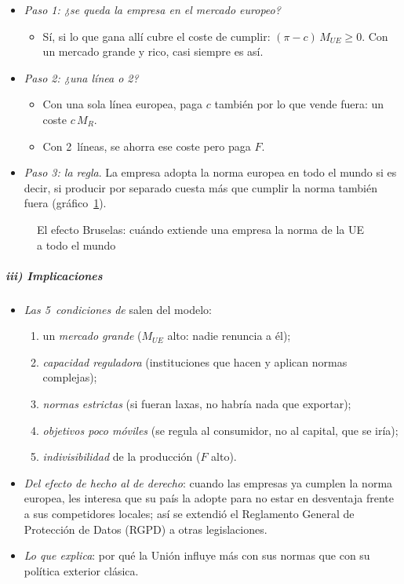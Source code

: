 \documentclass[11pt]{article}
\begin{document}
\begin{itemize}
\item \emph{Paso 1: ¿se queda la empresa en el mercado europeo?}
  \begin{itemize}
  \item Sí, si lo que gana allí cubre el coste de cumplir: $(\pi-c)\,M_{UE}\geq0$. Con un mercado grande y rico, casi siempre es así.
  \end{itemize}
\item \emph{Paso 2: ¿una línea o 2?}
  \begin{itemize}
  \item Con una sola línea europea, paga $c$ también por lo que vende fuera: un coste $c\,M_R$.
  \item Con 2~líneas, se ahorra ese coste pero paga $F$.
  \end{itemize}
\item \emph{Paso 3: la regla}. La empresa adopta la norma europea en todo el mundo si
  es decir, si producir por separado cuesta más que cumplir la norma también fuera (gráfico~\ref{fig:bruselas}).
\end{itemize}

\begin{figure}[H]
\centering
\caption{El efecto Bruselas: cuándo extiende una empresa la norma de la UE a todo el mundo}\label{fig:bruselas}
\end{figure}

\subparagraph{iii) Implicaciones}

\begin{itemize}
\item \emph{Las 5~condiciones de } salen del modelo:
  \begin{enumerate}
  \item un \emph{mercado grande} ($M_{UE}$ alto: nadie renuncia a él);
  \item \emph{capacidad reguladora} (instituciones que hacen y aplican normas complejas);
  \item \emph{normas estrictas} (si fueran laxas, no habría nada que exportar);
  \item \emph{objetivos poco móviles} (se regula al consumidor, no al capital, que se iría);
  \item \emph{indivisibilidad} de la producción ($F$ alto).
  \end{enumerate}
\item \emph{Del efecto de hecho al de derecho}: cuando las empresas ya cumplen la norma europea, les interesa que su país la adopte para no estar en desventaja frente a sus competidores locales; así se extendió el Reglamento General de Protección de Datos (RGPD) a otras legislaciones.
\item \emph{Lo que explica}: por qué la Unión influye más con sus normas que con su política exterior clásica.
\end{itemize}
\end{document}
